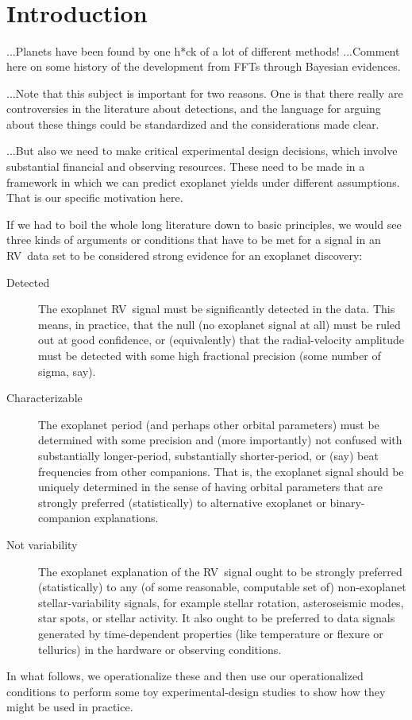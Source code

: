 \documentclass[modern]{aastex63}
\newcommand{\acronym}[1]{{\small{#1}}}
\newcommand{\rv}{\acronym{RV}}
\begin{document}

\section*{~}\clearpage
\section{Introduction} \label{sec:intro}

...Planets have been found by one h*ck of a lot of different methods!
...Comment here on some history of the development from \acronym{FFT}s
through Bayesian evidences.

...Note that this subject is important for two reasons. One is that
there really are controversies in the literature about detections, and
the language for arguing about these things could be standardized and
the considerations made clear.

...But also we need to make critical experimental design decisions,
which involve substantial financial and observing resources. These
need to be made in a framework in which we can predict exoplanet
yields under different assumptions. That is our specific motivation here.

If we had to boil the whole long literature down to basic principles,
we would see three kinds of arguments or conditions that have to be
met for a signal in an \rv\ data set to be considered strong evidence
for an exoplanet discovery:
\begin{description}
\item[Detected]
The exoplanet \rv\ signal must be significantly detected in the
data. This means, in practice, that the null (no exoplanet signal at
all) must be ruled out at good confidence, or (equivalently) that the
radial-velocity amplitude must be detected with some high fractional
precision (some number of sigma, say).
\item[Characterizable]
The exoplanet period (and perhaps other orbital parameters) must be
determined with some precision and (more importantly) not confused
with substantially longer-period, substantially shorter-period, or
(say) beat frequencies from other companions. That is, the exoplanet
signal should be uniquely determined in the sense of having orbital
parameters that are strongly preferred (statistically) to alternative
exoplanet or binary-companion explanations.
\item[Not variability]
The exoplanet explanation of the \rv\ signal ought to be strongly
preferred (statistically) to any (of some reasonable, computable set
of) non-exoplanet stellar-variability signals, for example stellar
rotation, asteroseismic modes, star spots, or stellar activity.
It also ought to be preferred to data signals generated by
time-dependent properties (like temperature or flexure or tellurics)
in the hardware or observing conditions.
\end{description}
In what follows, we operationalize these and then use our
operationalized conditions to perform some toy experimental-design
studies to show how they might be used in practice.
\end{document}

